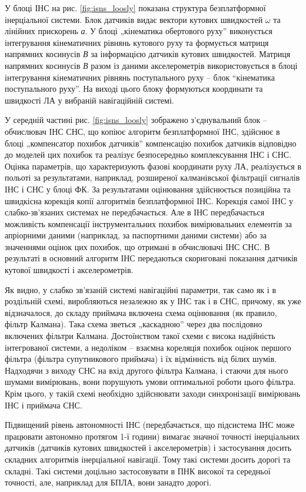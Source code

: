 У блоці ІНС на рис. \ref{fig:isns_loosly} показана структура безплатформної інерціальної системи. 
Блок датчиків видає вектори кутових  швидкостей $\omega$ та лінійних прискорень \textit{а}. 
У блоці „кінематика обертового руху'' виконується інтегрування кінематичних рівнянь 
кутового руху та формується матриця напрямних косинусів \textit{В} за інформацією 
датчиків кутових швидкостей. Матриця напрямних косинусів \textit{В} разом із даними 
акселерометрів використовується в блоці інтегрування кінематичних рівнянь поступального 
руху -- блок ``кінематика поступального руху''. На виході цього блоку формуються 
координати та швидкості ЛА у вибраній навігаційній системі.

У середній частині рис. \ref{fig:isns_loosly} зображено з'єднувальний блок -- обчислювач ІНС СНС, 
що копіює алгоритм безплатформної ІНС, здійснює в блоці „компенсатор похибок датчиків'' 
компенсацію похибок датчиків відповідно до моделей цих похибок та реалізує безпосередньо 
комплексування ІНС і СНС. Оцінка параметрів, що характеризують фазові координати 
руху ЛА, реалізується в польоті за результатами, наприклад, розширеної калманівської 
фільтрації сигналів ІНС і СНС у блоці ФК. За результатами оцінювання здійснюється 
позиційна та швидкісна корекція копії алгоритмів безплатформної ІНС. Корекція самої 
ІНС у слабко-зв'язаних системах не передбачається. Але в ІНС передбачається можливість 
компенсації інструментальних похибок вимірювальних елементів за апріорними даними 
(наприклад, за паспортними даними  системи) або за значеннями оцінок цих похибок, 
що отримані в обчислювачі ІНС СНС. В результаті в основний алгоритм ІНС передаються 
скориговані показання датчиків кутової швидкості і акселерометрів.

Як видно, у слабко зв'язаній системі навігаційні параметри, так само як і в роздільній 
схемі, виробляються незалежно як у ІНС так і в СНС, причому, як уже відзначалося, 
до складу приймача включена схема оцінювання (як правило, фільтр Калмана). Така схема 
зветься „каскадною'' через два послідовно включених фільтри Калмана. Достоїнством 
такої схеми є висока надійність інтегрованої системи, а недоліком -- взаємна кореляція 
похибок оцінок першого фільтра (фільтра супутникового приймача) і їх відмінність 
від білих шумів. Надходячи з виходу СНС на вхід другого фільтра Калмана, і стаючи 
для нього шумами вимірювань, вони порушують умови оптимальної роботи цього фільтра. 
Крім цього, у такій схемі необхідно здійснювати заходи синхронізації вимірювань ІНС 
і приймача СНС.

Підвищений рівень автономності ІНС (передбачається, що підсистема ІНС може працювати 
автономно протягом 1-ї години) вимагає значної точності інерціальних датчиків (датчиків 
кутових швидкостей і акселерометрів) і застосування досить складних алгоритмів інерціальної 
навігації. Тому такі системи досить дорогі та складні. Такі системи доцільно застосовувати 
в ПНК високої та середньої точності, але, наприклад для БПЛА, вони занадто дорогі.

